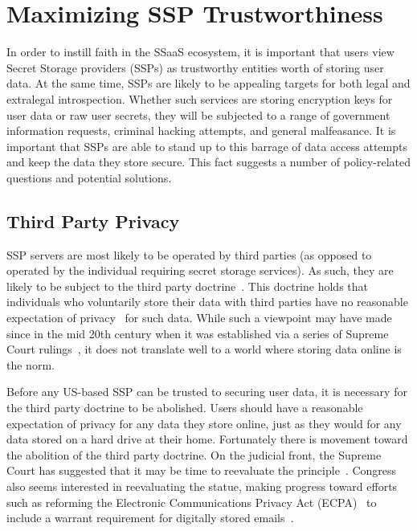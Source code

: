\section{Maximizing SSP Trustworthiness}

In order to instill faith in the SSaaS ecosystem, it is important that
users view Secret Storage providers (SSPs) as trustworthy entities
worth of storing user data. At the same time, SSPs are likely to be
appealing targets for both legal and extralegal introspection. Whether
such services are storing encryption keys for user data or raw user
secrets, they will be subjected to a range of government information
requests, criminal hacking attempts, and general malfeasance. It is
important that SSPs are able to stand up to this barrage of data
access attempts and keep the data they store secure. This fact
suggests a number of policy-related questions and potential solutions.

\subsection{Third Party Privacy}

SSP servers are most likely to be operated by third parties (as
opposed to operated by the individual requiring secret storage
services). As such, they are likely to be subject to the third party
doctrine~\cite{thompson-thirdparty}. This doctrine holds that
individuals who voluntarily store their data with third parties have
no reasonable expectation of privacy~\cite{scotus-katzvus} for such
data. While such a viewpoint may have made since in the mid 20th
century when it was established via a series of Supreme Court
rulings~\cite{scotus-usvmiller-privacy, scotus-smithvmaryland}, it
does not translate well to a world where storing data online is the
norm.

Before any US-based SSP can be trusted to securing user data, it is
necessary for the third party doctrine to be abolished. Users should
have a reasonable expectation of privacy for any data they store
online, just as they would for any data stored on a hard drive at
their home. Fortunately there is movement toward the abolition of the
third party doctrine. On the judicial front, the Supreme Court has
suggested that it may be time to reevaluate the
principle~\cite{scotus-usvjones}. Congress also seems interested in
reevaluating the statue, making progress toward efforts such as
reforming the Electronic Communications Privacy Act (ECPA)~\cite{ecpa}
to include a warrant requirement for digitally stored
emails~\cite{eff-ecpareform}.

